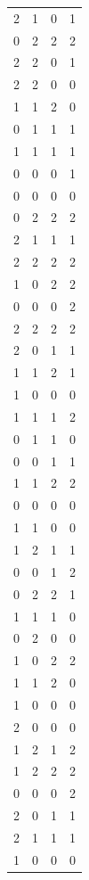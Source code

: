 \documentclass[12pt]{article}
\newenvironment{exercise}[2][Exercício]{\begin{trivlist}
\item[\hskip \labelsep {\bfseries #1}\hskip \labelsep {\bfseries #2.}]}{\end{trivlist}}
\begin{document}
\begin{exercise}{1.c}
\begin{longtable}{cccc}
2      & 1      & 0      & 1      \\
0      & 2      & 2      & 2      \\
2      & 2      & 0      & 1      \\
2      & 2      & 0      & 0      \\
1      & 1      & 2      & 0      \\
0      & 1      & 1      & 1      \\
1      & 1      & 1      & 1      \\
0      & 0      & 0      & 1      \\
0      & 0      & 0      & 0      \\
0      & 2      & 2      & 2      \\
2      & 1      & 1      & 1      \\
2      & 2      & 2      & 2      \\
1      & 0      & 2      & 2      \\
0      & 0      & 0      & 2      \\
2      & 2      & 2      & 2      \\
2      & 0      & 1      & 1      \\
1      & 1      & 2      & 1      \\
1      & 0      & 0      & 0      \\
1      & 1      & 1      & 2      \\
0      & 1      & 1      & 0      \\
0      & 0      & 1      & 1      \\
1      & 1      & 2      & 2      \\
0      & 0      & 0      & 0      \\
1      & 1      & 0      & 0      \\
1      & 2      & 1      & 1      \\
0      & 0      & 1      & 2      \\
0      & 2      & 2      & 1      \\
1      & 1      & 1      & 0      \\
0      & 2      & 0      & 0      \\
1      & 0      & 2      & 2      \\
1      & 1      & 2      & 0      \\
1      & 0      & 0      & 0      \\
2      & 0      & 0      & 0      \\
1      & 2      & 1      & 2      \\
1      & 2      & 2      & 2      \\
0      & 0      & 0      & 2      \\
2      & 0      & 1      & 1      \\
2      & 1      & 1      & 1      \\
1      & 0      & 0      & 0     
\end{longtable}
\end{exercise}
\end{document}
